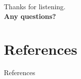 \documentclass[aspectratio=43,t]{beamer}
\begin{document}
  { %
    \begin{frame}[c,noframenumbering]
      \begin{center}
        Thanks for listening.\\
        {\bf Any questions?}
      \end{center}
    \end{frame}

    \section*{References}
    \begin{frame}{References}
      \printbibliography
    \end{frame}
  }
\end{document}
